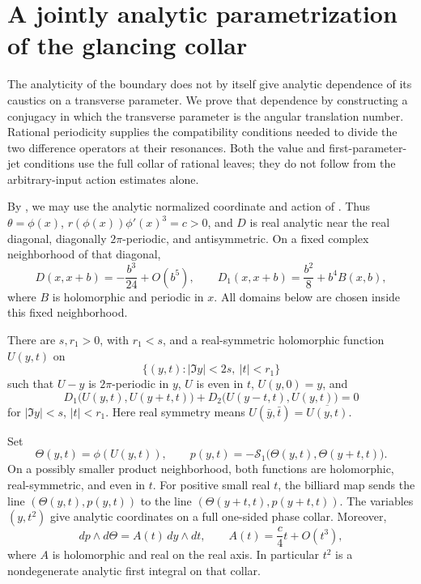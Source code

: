 \section{A jointly analytic parametrization of the glancing collar}
\label{joint:section}

The analyticity of the boundary does not by itself give analytic dependence
of its caustics on a transverse parameter. We prove that dependence by
constructing a conjugacy in which the transverse parameter is the angular
translation number. Rational periodicity supplies the compatibility
conditions needed to divide the two difference operators at their
resonances. Both the value and first-parameter-jet conditions use the
full collar of rational leaves; they do not follow from the
arbitrary-input action estimates alone.

By , we may use the
analytic normalized coordinate and action of
. Thus \(\theta=\phi(x)\),
\(r(\phi(x))\phi'(x)^3=c>0\), and \(D\) is real analytic near the real
diagonal, diagonally \(2\pi\)-periodic, and antisymmetric. On a fixed complex
neighborhood of that diagonal,
\begin{equation}
 D(x,x+b)=-\frac{b^3}{24}+O(b^5),\qquad
 D_1(x,x+b)=\frac{b^2}{8}+b^4 B(x,b),
 \label{joint:action-expansion}
\end{equation}
where \(B\) is holomorphic and periodic in \(x\). All domains below are
chosen inside this fixed neighborhood.

\begin{theorem}
\label{thm:joint-parametrization}
There are \(s,r_1>0\), with \(r_1<s\), and a real-symmetric holomorphic
function \(U(y,t)\) on
\[
 \{(y,t):|\Im y|<2s,\ |t|<r_1\}
\]
such that \(U-y\) is \(2\pi\)-periodic in \(y\), \(U\) is even in \(t\),
\(U(y,0)=y\), and
\begin{equation}
 D_1\bigl(U(y,t),U(y+t,t)\bigr)
 +D_2\bigl(U(y-t,t),U(y,t)\bigr)=0
 \label{joint:stationary-equation}
\end{equation}
for \(|\Im y|<s\), \(|t|<r_1\). Here real symmetry means
\(U(\bar y,\bar t)=\overline{U(y,t)}\).

Set
\begin{equation}
 \Theta(y,t)=\phi(U(y,t)),\qquad
 p(y,t)=-\mathcal S_1\bigl(\Theta(y,t),\Theta(y+t,t)\bigr).
 \label{joint:oriented-coordinates}
\end{equation}
On a possibly smaller product neighborhood, both functions are
holomorphic, real-symmetric, and even in \(t\). For positive small real
\(t\), the billiard map sends the line \((\Theta(y,t),p(y,t))\) to the
line \((\Theta(y+t,t),p(y+t,t))\). The variables \((y,t^2)\) give analytic
coordinates on a full one-sided phase collar. Moreover,
\begin{equation}
 dp\wedge d\Theta=A(t)\,dy\wedge dt,
 \qquad A(t)=\frac{c}{4}t+O(t^3),
 \label{eq:area-coefficient}
\end{equation}
where \(A\) is holomorphic and real on the real axis. In particular
\(t^2\) is a nondegenerate analytic first integral on that collar.
\end{theorem}

